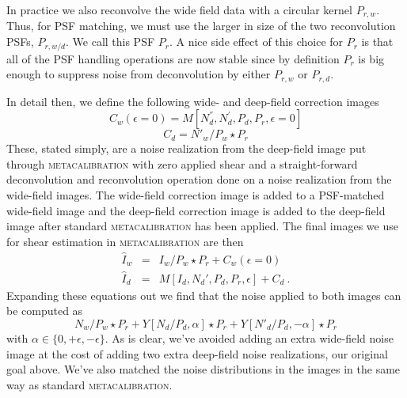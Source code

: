 \documentclass[twocolumn]{openjournal}
\makeatletter
\newcommand{\mcal}{\textsc{metacalibration}\@\xspace}
\makeatother
\begin{document}
In practice we also reconvolve the wide field data with a circular kernel $P_{r,w}$.
Thus, for PSF matching, we must use the larger in size of the two
reconvolution PSFs, $P_{r,w/d}$. We call this PSF $P_{r}$. A nice side effect of this
choice for $P_{r}$ is that all of the PSF handling operations are now stable since by
definition $P_{r}$ is big enough to suppress noise from deconvolution by either
$P_{r,w}$ or $P_{r,d}$.

In detail then, we define the following wide- and deep-field correction images
\begin{equation}\label{eqn:cw}
C_{w}(\epsilon=0) = M[N^{''}_d, N^{'}_d, P_d, P_{r}, \epsilon=0]
\end{equation}
\begin{equation}\label{eqn:cd}
C_{d} = N'_{w}/P_{w} \star P_{r}
\end{equation}
These, stated simply, are a noise realization from the deep-field image put through
\mcal with zero applied shear and a straight-forward deconvolution and reconvolution
operation done on a noise realization from the wide-field images. The wide-field
correction image is added to a PSF-matched wide-field image and the deep-field
correction image is added to the deep-field image after standard \mcal has been applied.
The final images we use for shear estimation in \mcal are then
\begin{eqnarray}
\hat I_{w} & = & I_{w}/P_{w} \star P_{r} + C_{w}(\epsilon=0)\\
\hat I_{d} & = & M[I_{d}, N_{d}', P_{d}, P_{r}, \epsilon] + C_{d}\ .
\end{eqnarray}
Expanding these equations out we find that the noise applied to both images can be
computed as
\begin{equation*}
N_{w}/P_{w}\star P_{r} + Y[N_{d}/P_{d}, \alpha] \star P_{r} + Y[N'_d/P_d, -\alpha] \star P_{r}
\end{equation*}
with $\alpha\in\{0,+\epsilon,-\epsilon\}$. As is clear, we've avoided adding an extra
wide-field noise image at the cost of adding two extra deep-field noise realizations,
our original goal above. We've also matched the noise distributions in the images in the
same way as standard \mcal.
\end{document}
